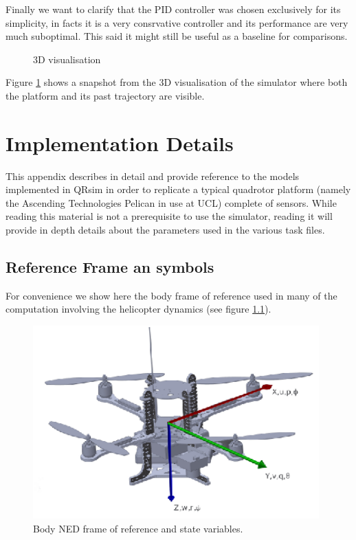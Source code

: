 \documentclass[a4paper,11pt]{report}
\newcommand{\sname}{QRsim\xspace}
\begin{document}
Finally we want to clarify that the PID controller was chosen exclusively for its simplicity, in facts it is a very consrvative controller and its performance are very much suboptimal. This said it might still be useful as a baseline for comparisons. 

\begin{center}
\begin{figure}
\label{fig:3d}
 \caption{3D visualisation}
\end{figure}
\end{center}

Figure \ref{fig:3d} shows a snapshot from the 3D visualisation of the simulator where both the platform and its past trajectory are visible.


\appendix
\chapter{Implementation Details}

This appendix describes in detail and provide reference to the models implemented in \sname in order to replicate a typical quadrotor platform (namely the Ascending Technologies Pelican \cite{asctec2011pelican} in use at UCL) complete of sensors.
While reading this material is not a prerequisite to use the simulator, reading it will provide in depth details about the parameters used in the various task files.

\section{Reference Frame an symbols}

For convenience we show here the body frame of reference used in many of the computation involving the helicopter dynamics (see figure \ref{fig:axes}). 
\begin{figure}[htbp]
 \begin{center}
 \includegraphics[width=11cm]{./axes.eps}
\caption{Body NED frame of reference and state variables.\label{fig:axes}}
\end{center}
\end{figure} 
\end{document}

